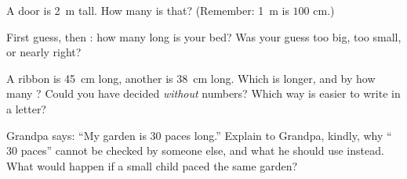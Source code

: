 \begin{exercise}[$\star$]\label{exo:g2:measuring-length:7}
A door is \qty{2}{m} tall. How many  is that? (Remember:
\qty{1}{m} is $100$ \unit{cm}.)
\end{exercise}

\begin{exercise}[$\star$]\label{exo:g2:measuring-length:8}
First guess, then : how many  long is your bed? Was
your guess too big, too small, or nearly right?
\end{exercise}

\begin{exercise}[$\star\star$]\label{exo:g2:measuring-length:9}
A ribbon is \qty{45}{cm} long, another is \qty{38}{cm} long. Which
is longer, and by how many ? Could you have decided
\emph{without} numbers? Which way is easier to write in a letter?
\end{exercise}

\begin{exercise}[$\star\star$]\label{exo:g2:measuring-length:10}
Grandpa says: ``My garden is $30$ paces long.'' Explain to Grandpa,
kindly, why ``$30$ paces'' cannot be checked by someone else, and
what he should use instead. What would happen if a small child paced
the same garden?
\end{exercise}
